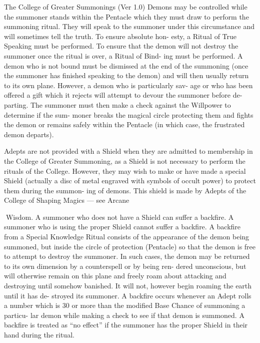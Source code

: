 \begin{Chapter}{The College of Greater Summonings (Ver 1.0)}
Demons  may  be  controlled  while  the  summoner 
stands within the Pentacle which they must draw to 
perform  the  summoning  ritual.  They  will  speak  to 
the  summoner  under  this  circumstance  and  will 
sometimes  tell  the  truth.  To  ensure  absolute  hon-
esty, a Ritual of True Speaking must be performed. 
To  ensure  that  the  demon  will  not  destroy  the 
summoner once the ritual is over, a Ritual of Bind-
ing must be performed. A demon who is not bound 
must  be  dismissed  at  the  end  of  the  summoning 
(once  the  summoner  has  finished  speaking  to  the 
demon)  and  will  then  usually  return  to  its  own 
plane.  However,  a  demon  who  is  particularly  sav-
age or who has been offered a gift which it rejects 
will  attempt  to  devour  the  summoner  before  de-
parting.  The  summoner  must  then  make  a  check 
against  the  Willpower  to  determine  if  the  sum-
moner  breaks  the  magical  circle  protecting  them 
and  fights  the  demon  or  remains  safely  within  the 
Pentacle  (in  which  case,  the  frustrated  demon 
departs). 

Adepts  are  not  provided  with  a  Shield  when  they 
are  admitted  to  membership  in  the  College  of 
Greater Summoning, as a Shield is not necessary to 
perform  the  rituals  of  the  College.  However,  they 
may  wish  to  make  or  have  made  a  special  Shield 
(actually a disc of metal engraved with symbols of 
occult power) to protect them during the summon-
ing  of  demons.  This  shield  is  made  by  Adepts  of 
the  College  of  Shaping  Magics  —  see  Arcane 

Wisdom. A summoner who does not have a Shield 
can suffer a backfire. A summoner who is using the 
proper  Shield  cannot  suffer  a  backfire.  A  backfire 
from  a  Special  Knowledge  Ritual  consists  of  the 
appearance  of  the  demon  being  summoned,  but 
inside the circle of protection (Pentacle) so that the 
demon is free to attempt to destroy the summoner. 
In  such  cases,  the  demon  may  be  returned  to  its 
own  dimension by  a  counterspell  or  by  being  ren-
dered  unconscious,  but  will  otherwise  remain  on 
this  plane  and  freely  roam  about  attacking  and 
destroying  until  somehow  banished.  It  will  not, 
however  begin  roaming  the  earth  until  it  has  de-
stroyed its summoner. A backfire occurs whenever 
an Adept rolls a number which is 30 or more than 
the modified Base Chance of summoning a particu-
lar  demon  while  making  a  check  to  see  if  that 
demon  is  summoned.  A  backfire  is  treated  as  “no 
effect”  if  the  summoner  has  the  proper  Shield  in 
their hand during the ritual. 


\end{Chapter}
